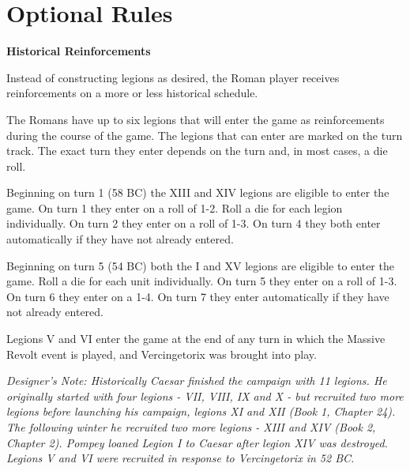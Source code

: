 \pagebreak[4]
\section{Optional Rules}
\par

\textbf{Historical Reinforcements}

Instead of constructing legions as desired, the Roman player receives reinforcements on a more or less historical schedule.

The Romans have up to six legions that will enter the game as reinforcements during the course of the game. The legions that can enter are marked on the turn track. The exact turn they enter depends on the turn and, in most cases, a die roll.

Beginning on turn 1 (58 BC) the XIII and XIV legions are eligible to enter the game. On turn 1 they enter on a roll of 1-2. Roll a die for each legion individually. On turn 2 they enter on a roll of 1-3. On turn 4 they both enter automatically if they have not already entered.

Beginning on turn 5 (54 BC) both the I and XV legions are eligible to enter the game. Roll a die for each unit individually. On turn 5 they enter on a roll of 1-3. On turn 6 they enter on a 1-4. On turn 7 they enter automatically if they have not already entered.

Legions V and VI enter the game at the end of any turn in which the Massive Revolt event is played, and Vercingetorix was brought into play.

\textit{Designer's Note: Historically Caesar finished the campaign with 11 legions. He originally started with four legions - VII, VIII, IX and X - but recruited two more legions before launching his campaign, legions XI and XII (Book 1, Chapter 24). The following winter he recruited two more legions - XIII and XIV (Book 2, Chapter 2). Pompey loaned Legion I to Caesar after legion XIV was destroyed. Legions V and VI were recruited in response to Vercingetorix in 52 BC.}